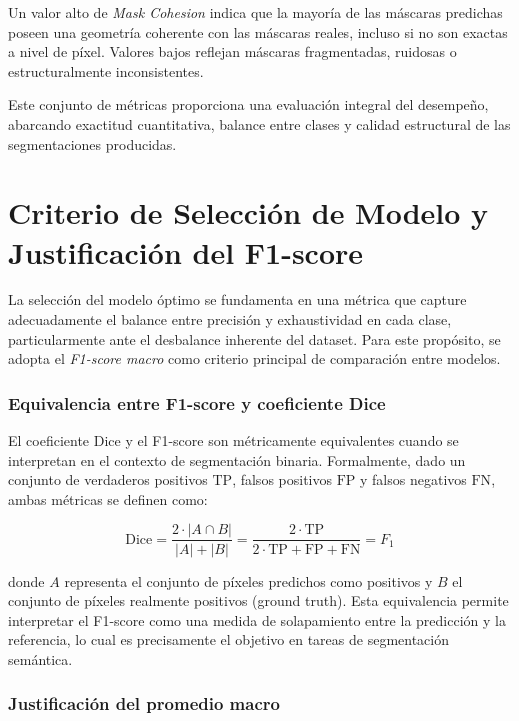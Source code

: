 \documentclass[onecolumn, 12pt , journal]{IEEEtran}
\begin{document}
Un valor alto de \emph{Mask Cohesion} indica que la mayoría de las máscaras predichas poseen una geometría coherente con las máscaras reales, incluso si no son exactas a nivel de píxel. Valores bajos reflejan máscaras fragmentadas, ruidosas o estructuralmente inconsistentes.


Este conjunto de métricas proporciona una evaluación integral del desempeño, abarcando exactitud cuantitativa, balance entre clases y calidad estructural de las segmentaciones producidas.


\section{Criterio de Selección de Modelo y Justificación del F1-score}

La selección del modelo óptimo se fundamenta en una métrica que capture adecuadamente el balance entre precisión y exhaustividad en cada clase, particularmente ante el desbalance inherente del dataset. Para este propósito, se adopta el \emph{F1-score macro} como criterio principal de comparación entre modelos.

\subsubsection{Equivalencia entre F1-score y coeficiente Dice}

El coeficiente Dice y el F1-score son métricamente equivalentes cuando se interpretan en el contexto de segmentación binaria. Formalmente, dado un conjunto de verdaderos positivos $\text{TP}$, falsos positivos $\text{FP}$ y falsos negativos $\text{FN}$, ambas métricas se definen como:

\begin{equation}
    \text{Dice} = \frac{2 \cdot |A \cap B|}{|A| + |B|} = \frac{2 \cdot \text{TP}}{2 \cdot \text{TP} + \text{FP} + \text{FN}} = F_1
\end{equation}

donde $A$ representa el conjunto de píxeles predichos como positivos y $B$ el conjunto de píxeles realmente positivos (ground truth). Esta equivalencia permite interpretar el F1-score como una medida de solapamiento entre la predicción y la referencia, lo cual es precisamente el objetivo en tareas de segmentación semántica.

\subsubsection{Justificación del promedio macro}
\end{document}
